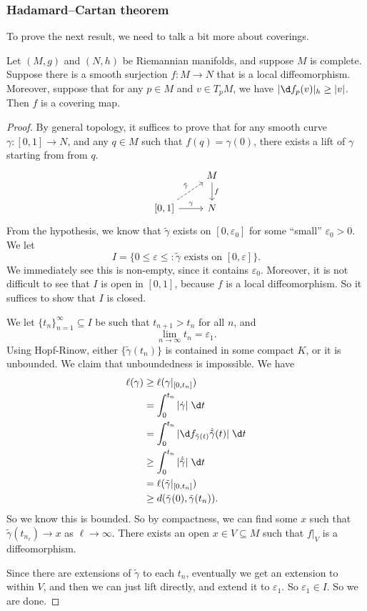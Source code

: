 \documentclass[a4paper]{article}
\begin{document}
\subsubsection*{Hadamard--Cartan theorem}
To prove the next result, we need to talk a bit more about coverings.
\begin{prop}
  Let $(M, g)$ and $(N, h)$ be Riemannian manifolds, and suppose $M$ is complete. Suppose there is a smooth surjection $f: M \to N$ that is a local diffeomorphism. Moreover, suppose that for any $p \in M$ and $v \in T_p M$, we have $|\d f_p (v)|_h \geq |v|$. Then $f$ is a covering map.
\end{prop}

\begin{proof}
  By general topology, it suffices to prove that for any smooth curve $\gamma: [0, 1] \to N$, and any $q \in M$ such that $f(q) = \gamma(0)$, there exists a lift of $\gamma$ starting from from $q$.
  \[
    \begin{tikzcd}
      & M \ar[d, "f"]\\
      \lbrack 0, 1\rbrack \ar[r, "\gamma"] \ar[ur, dashed, "\tilde{\gamma}"] & N
    \end{tikzcd}
  \]
  From the hypothesis, we know that $\tilde{\gamma}$ exists on $[0, \varepsilon_0]$ for some ``small'' $\varepsilon_0 > 0$. We let
  \[
    I = \{0 \leq \varepsilon \leq : \tilde{\gamma} \text{ exists on }[0, \varepsilon]\}.
  \]
  We immediately see this is non-empty, since it contains $\varepsilon_0$. Moreover, it is not difficult to see that $I$ is open in $[0, 1]$, because $f$ is a local diffeomorphism. So it suffices to show that $I$ is closed.

  We let $\{t_n\}_{n = 1}^\infty \subseteq I$ be such that $t_{n + 1} > t_n$ for all $n$, and
  \[
    \lim_{n \to \infty} t_n = \varepsilon_1.
  \]
  Using Hopf-Rinow, either $\{\tilde{\gamma}(t_n)\}$ is contained in some compact $K$, or it is unbounded. We claim that unboundedness is impossible. We have
  \begin{align*}
    \ell(\gamma) &\geq \ell(\gamma|_{[0, t_n]}) \\
    &= \int_0^{t_n} |\dot{\gamma}|\; \d t\\
    &= \int_0^{t_n} |\d f_{\tilde{\gamma}(t)} \dot{\tilde{\gamma}}(t)|\;\d t\\
    &\geq \int_0^{t_n} |\dot{\tilde{\gamma}}| \;\d t \\
    &= \ell(\tilde{\gamma}|_{[0, t_n]}) \\
    &\geq d(\tilde{\gamma}(0), \tilde{\gamma}(t_n)).
  \end{align*}
  So we know this is bounded. So by compactness, we can find some $x$ such that $\tilde{\gamma} (t_{n_\ell}) \to x$ as $\ell \to \infty$. There exists an open $x \in V \subseteq M$ such that $f|_{V}$ is a diffeomorphism.

  Since there are extensions of $\tilde{\gamma}$ to each $t_n$, eventually we get an extension to within $V$, and then we can just lift directly, and extend it to $\varepsilon_1$. So $\varepsilon_1 \in I$. So we are done.
\end{proof}
\end{document}
